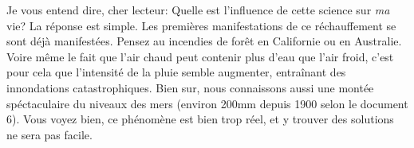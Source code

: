 \documentclass[12pt]{article}
\begin{document}
    \indent Je vous entend dire, cher lecteur: Quelle est l'influence de cette science sur \textit{ma} vie? La réponse est simple. Les premières manifestations de ce réchauffement se sont déjà manifestées. Pensez au incendies de forêt en Californie ou en Australie. Voire même le fait que l'air chaud peut contenir plus d'eau que l'air froid, c'est pour cela que l'intensité de la pluie semble augmenter, entraînant des innondations catastrophiques. Bien sur, nous connaissons aussi une montée spéctaculaire du niveaux des mers (environ 200mm depuis 1900 selon le document 6). Vous voyez bien, ce phénomène est bien trop réel, et y trouver des solutions ne sera pas facile.
\end{document}
